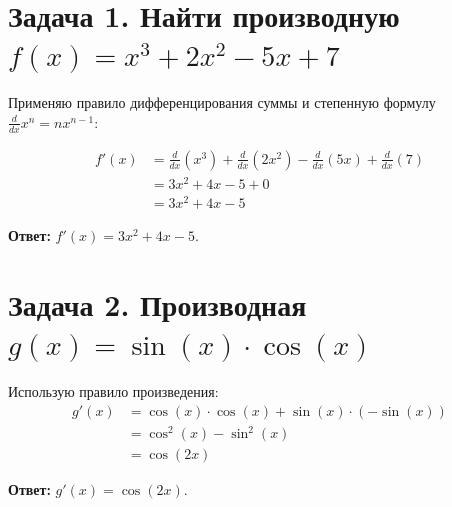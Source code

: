 \documentclass{article}
\begin{document}
\section*{Задача 1. Найти производную $f(x) = x^3 + 2x^2 - 5x + 7$}

Применяю правило дифференцирования суммы и степенную формулу
$\frac{d}{dx} x^n = n x^{n-1}$:

\begin{align*}
f'(x) &= \frac{d}{dx}\left(x^3\right) + \frac{d}{dx}\left(2x^2\right) - \frac{d}{dx}\left(5x\right) + \frac{d}{dx}\left(7\right) \\
      &= 3x^2 + 4x - 5 + 0 \\
      &= 3x^2 + 4x - 5
\end{align*}

\textbf{Ответ:} $f'(x) = 3x^2 + 4x - 5$.

\section*{Задача 2. Производная $g(x) = \sin(x) \cdot \cos(x)$}

Использую правило произведения:
\begin{align*}
g'(x) &= \cos(x) \cdot \cos(x) + \sin(x) \cdot (-\sin(x)) \\
      &= \cos^2(x) - \sin^2(x) \\
      &= \cos(2x)
\end{align*}

\textbf{Ответ:} $g'(x) = \cos(2x)$.
\end{document}
